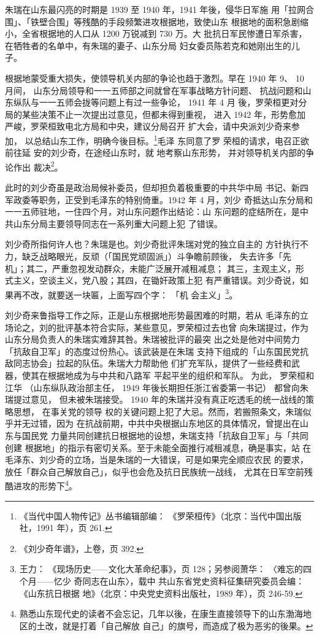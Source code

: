 朱瑞在山东最闪亮的时期是 1939 至 1940 年，1941 年後，侵华日军施
用「拉网合围」、「铁壁合围」等残酷的手段频繁进攻根据地，致使山东
根据地的面积急剧缩小，全省根据地的人口从 1200 万锐减到 730 万。大
批抗日军民惨遭日军杀害，在牺牲者的名单中，有朱瑞的妻子、山东分局
妇女委员陈若克和她刚出生的儿子。

根据地蒙受重大损失，使领导机关内部的争论也趋于激烈。早在 1940 年 9、 10
月间， 山东分局领导和一一五师部之间就曾在军事战略方针问题、 抗战问题和山
东纵队与一一五师会拢等问题上有过一些争论， 1941 年 4 月 後，罗荣桓更对分
局的某些决策不止一次提出过意见，但都未得到重视， 进入 1942 年，形势愈加
严峻，罗荣桓致电北方局和中央，建议分局召开 扩大会，请中央派刘少奇来参加，
以总结山东工作，明确今後目标。\footnote{《当代中国人物传记》丛书编辑部编：
《罗荣桓传》（北京：当代中国出版社，1991 年），页 261.}毛泽 东同意了罗
荣桓的请求，电召正欲前往延 安的刘少奇，在途经山东时，就 地考察山东形势，
并对领导机关内部的争论作出 裁决\footnote{《刘少奇年谱》，上卷，页 392.}。

此时的刘少奇虽是政治局候补委员，但却担负着极重要的中共华中局
书记、新四军政委等职务，正受到毛泽东的特别倚重。1942 年 4 月，刘少
奇抵达山东分局和一一五师驻地，一住四个月，对山东问题作出结论：山
东问题的症结所在，是中共山东分局主要领导同志在一系列重大问题上犯
了错误。

刘少奇所指何许人也？朱瑞是也。刘少奇批评朱瑞对党的独立自主的 方针执行不
力，缺乏战略眼光，反顽（「国民党顽固派」）斗争瞻前顾後， 失去许多「先
机」；其二，严重忽视发动群众，未能广泛展开减租减息； 其三，主观主义，形
式主义，空谈主义，党八股；其四，在锄奸政策上犯 有严重错误。刘少奇说，如
果再不改，就要送一块匾，上面写四个字： 「机 会主义」\footnote{ 王力：
《现场历史——文化大革命纪事》，页 128；另参阅萧华： 〈难忘的四个月——忆少
奇同志在山东〉，载中 共山东省党史资料征集研究委员会编： 《山东抗日根据
地》（北京：中央党史资料出版社，1989 年），页 246-59.}。

刘少奇来鲁指导工作之际，正是山东根据地形势最困难的时期，若从
毛泽东的立场论之，刘的批评基本符合实际，某些意见，罗荣桓过去也曾
向朱瑞提过，作为山东分局负责人的朱瑞实难辞其咎。朱瑞被批评的最突
出之处是他对中间势力「抗敌自卫军」的态度过份热心。该武装是在朱瑞
支持下组成的「山东国民党抗敌同志协会」拉起的队伍。朱瑞大力帮助他
们扩充军队，提供了一些经费和武器，使其在根据地成为与中共和八路军
平起平坐的组织和军队。
为此，
罗荣桓和江华
（山东纵队政治部主任，
1949
年後长期担任浙江省委第一书记）
都曾向朱瑞提过意见，
但未被朱瑞接受。
1940 年的朱瑞并没有真正吃透毛的统一战线的策略思想，
在事关党的领导
权的关键问题上犯了大忌。然而，若搬照条文，朱瑞似乎并无过错，因为
在抗战前期，中共中央根据山东地区的具体情况，曾提出在山东与国民党
力量共同创建抗日根据地的设想，朱瑞支持「抗敌自卫军」与「共同创建
根据地」的指示有密切关系。至于未能全面推行减租减息，确是事实，站
在毛泽东、刘少奇的立场，当是朱瑞的一大错误，可是如果完全顺应农民
的要求，放任「群众自己解放自己」，似乎也会危及抗日民族统一战线，
尤其在日军空前残酷进攻的形势下\footnote{熟悉山东现代史的读者不会忘记，几年以後，在康生直接领导下的山东渤海地区的土改，就是打着「自己解放
自己」的旗号，而造成了极为恶劣的後果。}。

